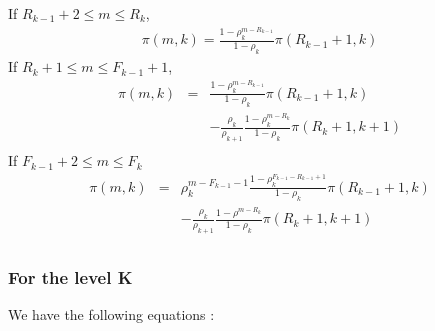 \documentclass[conference]{IEEEtran}
\begin{document}
If  $R_{k-1}+2 \leq m \leq R_k$,  
\begin{eqnarray}
\pi(m,k)=\frac{1-\rho_k^{m-R_{k-1}}}{1-\rho_k} \pi(R_{k-1}+1,k)
\label{eqB1}
\end{eqnarray} 
If $R_k+1 \leq m \leq F_{k-1}+1$, 
\begin{eqnarray} 
 \pi(m,k)&=&\frac{1-\rho_k^{m-R_{k-1} }} {1-\rho_k} \pi(R_{k-1}+1,k) \nonumber\\
&&-\frac{\rho_k}{\rho_{k+1}} \frac{1- \rho_k^{m-R_k}}{1-\rho_k} \pi(R_k+1,k+1) \\
\label{eqB2}
 \end{eqnarray} 
If $F_{k-1}+2 \leq m \leq F_k$ 
 \begin{eqnarray} 
 \pi(m,k)&= & \rho_k^{m-F_{k-1}-1} \frac{1-\rho_k^{F_{k-1}-R_{k-1}+1}} {1-\rho_k} \pi(R_{k-1}+1,k) \nonumber \\
 &&- \frac{\rho_k}{\rho_{k+1}}
\frac{1-\rho^{m-R_k}}{1-\rho_k} \pi(R_{k}+1,k+1) \\
\label{eqB3}
 \end{eqnarray} 

\subsubsection{For the level K}

We have the following equations :
\end{document}
